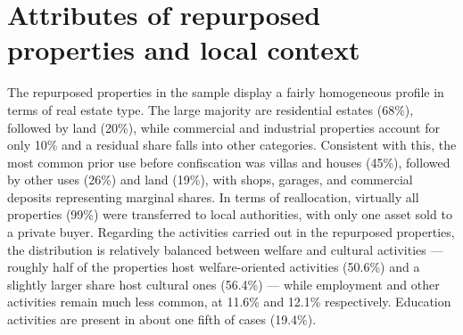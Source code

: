\documentclass[12pt]{article}
\theoremstyle{plain}
\theoremstyle{plain}
\theoremstyle{plain}
\theoremstyle{definition}
\theoremstyle{plain}
\theoremstyle{definition}
\theoremstyle{plain}
\theoremstyle{remark}
\theoremstyle{definition}
\theoremstyle{definition}
\theoremstyle{plain}
\begin{document}
\newpage
\renewcommand{\thefigure}{B.\arabic{figure}}
\renewcommand{\thetable}{B.\arabic{table}}
\setcounter{figure}{0}
\setcounter{table}{0}
\FloatBarrier
\section{Attributes of repurposed properties and local context}
\label{sec:jmp_app_B}
The repurposed properties in the sample display a fairly homogeneous profile in terms of real estate type. The large majority are residential estates (68\%), followed by land (20\%), while commercial and industrial properties account for only 10\% and a residual share falls into other categories. Consistent with this, the most common prior use before confiscation was villas and houses (45\%), followed by other uses (26\%) and land (19\%), with shops, garages, and commercial deposits representing marginal shares. In terms of reallocation, virtually all properties (99\%) were transferred to local authorities, with only one asset sold to a private buyer. Regarding the activities carried out in the repurposed properties, the distribution is relatively balanced between welfare and cultural activities — roughly half of the properties host welfare-oriented activities (50.6\%) and a slightly larger share host cultural ones (56.4\%) — while employment and other activities remain much less common, at 11.6\% and 12.1\% respectively. Education activities are present in about one fifth of cases (19.4\%).
\end{document}
